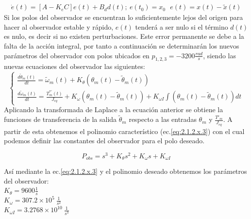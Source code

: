 \documentclass[10pt]{article}
\begin{document}
\begin{itemize}
	\begin{eqnarray}
		\dot{e}(t)=[A-K_{e}C]e(t)+B_{d}d(t); \ e(t_{0})=x_{0}  \ \ \
		e(t)=x(t)-\tilde{x}(t)
		\label{eq:2.1.2.x.1}
	\end{eqnarray}
	Si los polos del observador se encuentran lo suficientemente lejos del origen para hacer al observador estable y rápido, $e(t)$ tenderá a ser nulo si el término $d(t)$ es nulo, es decir si no existen perturbaciones.
	Este error permanente se debe a la falta de la acción integral, por tanto a continuación se determinarán los nuevos parámetros del observador con polos ubicados en $p_{1,2,3}=-3200 \frac{rad}{s}$, siendo las nuevas ecuaciones del observador las siguientes:
	\begin{equation}
		\left\{\begin{matrix}
			\frac{d\tilde{\theta}_{m}(t)}{dt}=\tilde{\omega}_{m}(t)+K_{\theta}(\theta_{m}(t)-\tilde{\theta}_{m}(t))\\
			\frac{d\tilde{\omega}_{m}(t)}{dt}=\frac{T^{*'}_{m}(t)}{J_{eq}}+K_{\omega}(\theta_{m}(t)-\tilde{\theta}_{m}(t))+K_{\omega I}\int (\theta_{m}(t)-\tilde{\theta}_{m}(t))dt
			
			\end{matrix}\right.
			\label{eq:2.1.2.x.2}
	\end{equation}
	Aplicando la transformada de Laplace a la ecuación anterior se obtiene la funciones de transferencia de la salida $\tilde{\theta}_{m}$ respecto a las entradas $\theta_{m}$ y $\frac{T'_{m}}{J_{eq}}$. A partir de esta obtenemos el polinomio característico (ec.\ref{eq:2.1.2.x.3}) con el cual podemos definir las constantes del observador para el polo deseado.

		\begin{equation}
		P_{obs}=s^{3}+K_{\theta}s^{2}+K_{\omega}s+K_{\omega I}
			\label{eq:2.1.2.x.3}
	\end{equation}

	Así mediante la ec.\ref{eq:2.1.2.x.3} y el polinomio deseado obtenemos los parámetros del observador:\\
	$K_{\theta}=9600 \frac{1}{s}$\\
	$K_{\omega}=307.2 \times 10^{5} \ \frac{1}{s^{2}}$\\
	$K_{\omega I}=3.2768 \times  10^{10} \ \frac{1}{s^{3}}$\\


\end{itemize}
\end{document}
